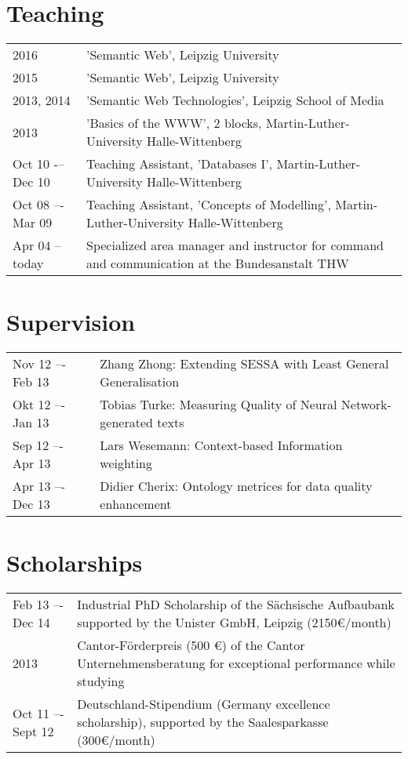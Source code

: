 \section*{Teaching}
\begin{tabular}{p{3cm}p{10cm}}	
2016		    & 'Semantic Web', Leipzig University\\
2015		    & 'Semantic Web', Leipzig University\\
2013, 2014	    & 'Semantic Web Technologies', Leipzig School of Media\\
2013		    & 'Basics of the WWW', 2 blocks, Martin-Luther-University Halle-Wittenberg\\
Oct 10 -– Dec 10	& 	Teaching Assistant, 'Databases I', Martin-Luther-University Halle-Wittenberg\\
Oct 08 –- Mar 09	& 	Teaching Assistant, 'Concepts of Modelling', Martin-Luther-University Halle-Wittenberg\\
Apr 04 -- today	& Specialized area manager and instructor for command and communication at the Bundesanstalt THW\\
\end{tabular}

\section*{Supervision}
\begin{tabular}{p{3cm}p{10cm}}	
Nov 12 –- Feb 13 	& 	Zhang Zhong: Extending SESSA with Least General Generalisation\\
Okt 12 –- Jan 13 	& 	Tobias Turke: Measuring Quality of Neural Network-generated texts\\
Sep 12 –- Apr 13 	& 	Lars Wesemann: Context-based Information weighting\\
Apr 13 –- Dec 13 	& 	Didier Cherix: Ontology metrices for data quality enhancement
\end{tabular}

\section*{Scholarships}
\begin{tabular}{p{3cm}p{10cm}}	
Feb 13 –- Dec 14 	& 	Industrial PhD Scholarship of the Sächsische Aufbaubank supported by the Unister GmbH, Leipzig (2150€/month)\\
2013	        	&   Cantor-Förderpreis (500 €) of the Cantor Unternehmensberatung for exceptional performance while studying\\
Oct 11 –- Sept 12 	& 	Deutschland-Stipendium (Germany excellence scholarship), supported by the Saalesparkasse (300€/month)\\
\end{tabular}

